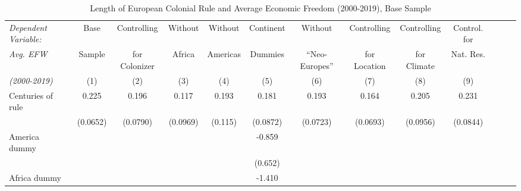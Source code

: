 \begin{sidewaystable}[h!]
\begin{threeparttable}
\begin{center}
\begin{minipage}{\textwidth}
\small
\caption{Length of European Colonial Rule and Average Economic Freedom (2000-2019), Base Sample}
\label{tab:Tab4}
\begin{tabular*}{\textwidth}{@{\extracolsep{\fill}}lcccccccccccc@{\extracolsep{\fill}}}
\hline\hline
            \textit{Dependent Variable:}&\multicolumn{1}{c}{Base}&\multicolumn{1}{c}{Controlling}&\multicolumn{1}{c}{Without}&\multicolumn{1}{c}{Without}&\multicolumn{1}{c}{Continent}&\multicolumn{1}{c}{Without}&\multicolumn{1}{c}{Controlling}&\multicolumn{1}{c}{Controlling}&\multicolumn{1}{c}{Control. for}\\
            \textit{Avg. EFW}&\multicolumn{1}{c}{Sample}&\multicolumn{1}{c}{for Colonizer}&\multicolumn{1}{c}{Africa}&\multicolumn{1}{c}{Americas}&\multicolumn{1}{c}{Dummies}&\multicolumn{1}{c}{``Neo-Europes''}&\multicolumn{1}{c}{for Location}&\multicolumn{1}{c}{for Climate}&\multicolumn{1}{c}{Nat. Res.}\\
            \textit{(2000-2019)}&\multicolumn{1}{c}{(1)}&\multicolumn{1}{c}{(2)}&\multicolumn{1}{c}{(3)}&\multicolumn{1}{c}{(4)}&\multicolumn{1}{c}{(5)}&\multicolumn{1}{c}{(6)}&\multicolumn{1}{c}{(7)}&\multicolumn{1}{c}{(8)}&\multicolumn{1}{c}{(9)}\\
\hline
Centuries of rule &       0.225\sym{***}&       0.196\sym{**} &       0.117         &       0.193\sym{*}  &       0.181\sym{**} &       0.193\sym{***}&       0.164\sym{**} &       0.205\sym{**} &       0.231\sym{***}\\
            &    (0.0652)         &    (0.0790)         &    (0.0969)         &     (0.115)         &    (0.0872)         &    (0.0723)         &    (0.0693)         &    (0.0956)         &    (0.0844)         \\
[0.125em]
America dummy     &                     &                     &                     &                     &      -0.859         &                     &                     &                     &                     \\
            &                     &                     &                     &                     &     (0.652)         &                     &                     &                     &                     \\
[0.125em]
Africa dummy      &                     &                     &                     &                     &      -1.410\sym{**}&                     &                     &                     &                     \\

\end{tabular*}
\end{minipage}
\end{center}
\end{threeparttable}
\end{sidewaystable}
